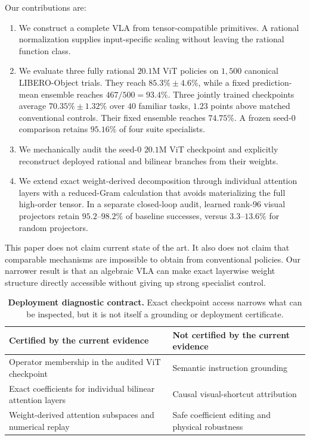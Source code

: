 \documentclass{article}
\begin{document}
Our contributions are:

\begin{enumerate}
  \item We construct a complete VLA from tensor-compatible primitives. A rational normalization
        supplies input-specific scaling without leaving the rational function class.
  \item We evaluate three fully rational $20.1$M ViT policies on $1{,}500$ canonical
        LIBERO-Object trials. They reach $85.3\%\pm4.6\%$, while a fixed prediction-mean
        ensemble reaches $467/500=93.4\%$. Three jointly trained checkpoints average
        $70.35\%\pm1.32\%$ over $40$ familiar tasks, $1.23$ points above matched
        conventional controls. Their fixed ensemble reaches
        $74.75\%$. A frozen seed-$0$ comparison retains $95.16\%$ of four suite specialists.
  \item We mechanically audit the seed-$0$ $20.1$M ViT checkpoint and explicitly reconstruct deployed
        rational and bilinear branches from their weights.
  \item We extend exact weight-derived decomposition through individual attention layers with a
        reduced-Gram calculation that avoids materializing the full high-order tensor. In a
        separate closed-loop audit, learned rank-$96$ visual projectors retain $95.2$--$98.2\%$ of
        baseline successes, versus $3.3$--$13.6\%$ for random projectors.
\end{enumerate}

This paper does not claim current state of the art. It also does not claim that comparable
mechanisms are impossible to obtain from conventional policies. Our narrower result is that an
algebraic VLA can make exact layerwise weight structure directly accessible without giving up
strong specialist control.

\begin{table}[H]
\centering
\small
\begin{tabular}{@{}p{}p{}@{}}
\toprule
Certified by the current evidence & Not certified by the current evidence \\
\midrule
Operator membership in the audited ViT checkpoint & Semantic instruction grounding \\
Exact coefficients for individual bilinear attention layers & Causal visual-shortcut attribution \\
Weight-derived attention subspaces and numerical replay & Safe coefficient editing and physical robustness \\
\bottomrule
\end{tabular}
\caption{\textbf{Deployment diagnostic contract.} Exact checkpoint access narrows what can be
inspected, but it is not itself a grounding or deployment certificate.}
\label{tab:diagnostic-contract}
\end{table}
\end{document}
